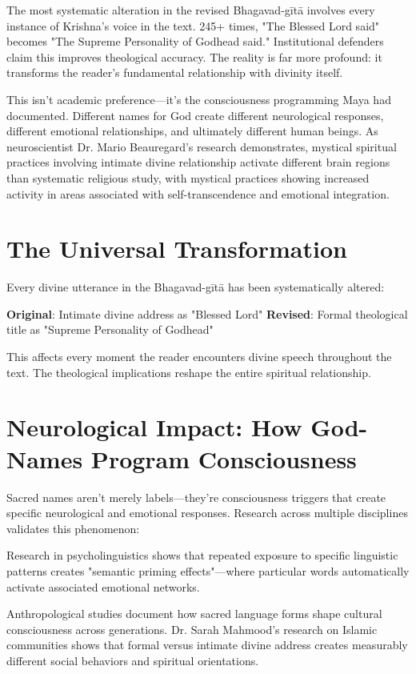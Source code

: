 \documentclass[11pt,twoside]{book}
\begin{document}
\normalfont\justifying
The most systematic alteration in the revised Bhagavad-gītā involves every instance of Krishna's voice in the text. 245+ times, "The Blessed Lord said" becomes "The Supreme Personality of Godhead said." Institutional defenders claim this improves theological accuracy. The reality is far more profound: it transforms the reader's fundamental relationship with divinity itself.

This isn't academic preference—it's the consciousness programming Maya had documented. Different names for God create different neurological responses, different emotional relationships, and ultimately different human beings. As neuroscientist Dr. Mario Beauregard's research demonstrates, mystical spiritual practices involving intimate divine relationship activate different brain regions than systematic religious study, with mystical practices showing increased activity in areas associated with self-transcendence and emotional integration.
\section*{The Universal Transformation}
\label{sec:orgc123a7c}

Every divine utterance in the Bhagavad-gītā has been systematically altered:

\textbf{\textbf{Original}}: Intimate divine address as "Blessed Lord"
\textbf{\textbf{Revised}}: Formal theological title as "Supreme Personality of Godhead"

This affects every moment the reader encounters divine speech throughout the text. The theological implications reshape the entire spiritual relationship.
\section*{Neurological Impact: How God-Names Program Consciousness}
\label{sec:org4f5a31d}

Sacred names aren't merely labels—they're consciousness triggers that create specific neurological and emotional responses. Research across multiple disciplines validates this phenomenon:

Research in psycholinguistics shows that repeated exposure to specific linguistic patterns creates "semantic priming effects"—where particular words automatically activate associated emotional networks.

Anthropological studies document how sacred language forms shape cultural consciousness across generations. Dr. Sarah Mahmood's research on Islamic communities shows that formal versus intimate divine address creates measurably different social behaviors and spiritual orientations.
\end{document}
